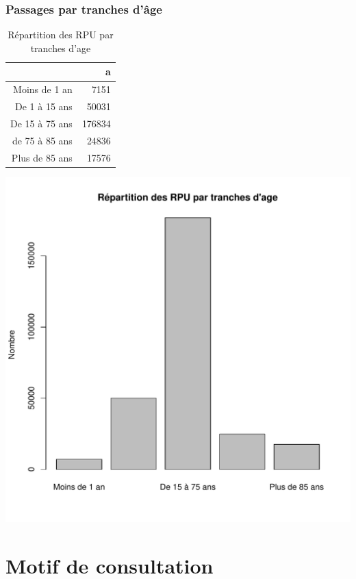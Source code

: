 \documentclass[12pt,english,french,twoside]{report}\usepackage[]{graphicx}\usepackage[]{color}
\makeatletter
\def\maxwidth{ %
  \ifdim\Gin@nat@width>\linewidth
    \linewidth
  \else
    \Gin@nat@width
  \fi
}
\makeatother
\begin{document}
\subsection{Passages par tranches d'âge}


\begin{table}[ht]
\centering
\begin{tabular}{rr}
  \hline
 & a \\ 
  \hline
Moins de 1 an & 7151 \\ 
  De 1 à 15 ans & 50031 \\ 
  De 15 à 75 ans & 176834 \\ 
  de 75 à 85 ans & 24836 \\ 
  Plus de 85 ans & 17576 \\ 
   \hline
\end{tabular}
\caption[Répartition des RPU par tranches d'age]{Répartition des RPU par tranches d'age} 
\label{tab:tranche}
\end{table}

\includegraphics[width=\maxwidth]{figure/tranche} 




\newpage
\chapter{Motif de consultation}
\end{document}
